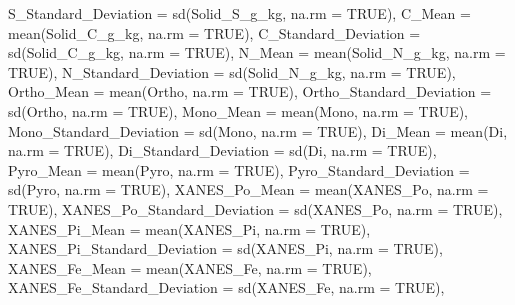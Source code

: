 \documentclass[
]{article}
\newenvironment{Shaded}{\begin{snugshade}}{\end{snugshade}}
\newcommand{\AttributeTok}[1]{\textcolor[rgb]{0.77,0.63,0.00}{#1}}
\newcommand{\ConstantTok}[1]{\textcolor[rgb]{0.00,0.00,0.00}{#1}}
\newcommand{\FunctionTok}[1]{\textcolor[rgb]{0.00,0.00,0.00}{#1}}
\newcommand{\NormalTok}[1]{#1}
\begin{document}
\begin{Shaded}
\begin{Highlighting}[]
    \AttributeTok{S\_Standard\_Deviation =} \FunctionTok{sd}\NormalTok{(Solid\_S\_g\_kg, }\AttributeTok{na.rm =} \ConstantTok{TRUE}\NormalTok{),}
    \AttributeTok{C\_Mean =} \FunctionTok{mean}\NormalTok{(Solid\_C\_g\_kg, }\AttributeTok{na.rm =} \ConstantTok{TRUE}\NormalTok{),}
    \AttributeTok{C\_Standard\_Deviation =} \FunctionTok{sd}\NormalTok{(Solid\_C\_g\_kg, }\AttributeTok{na.rm =} \ConstantTok{TRUE}\NormalTok{),}
    \AttributeTok{N\_Mean =} \FunctionTok{mean}\NormalTok{(Solid\_N\_g\_kg, }\AttributeTok{na.rm =} \ConstantTok{TRUE}\NormalTok{),}
    \AttributeTok{N\_Standard\_Deviation =} \FunctionTok{sd}\NormalTok{(Solid\_N\_g\_kg, }\AttributeTok{na.rm =} \ConstantTok{TRUE}\NormalTok{),}
    \AttributeTok{Ortho\_Mean =} \FunctionTok{mean}\NormalTok{(Ortho, }\AttributeTok{na.rm =} \ConstantTok{TRUE}\NormalTok{),}
    \AttributeTok{Ortho\_Standard\_Deviation =} \FunctionTok{sd}\NormalTok{(Ortho, }\AttributeTok{na.rm =} \ConstantTok{TRUE}\NormalTok{),}
    \AttributeTok{Mono\_Mean =} \FunctionTok{mean}\NormalTok{(Mono, }\AttributeTok{na.rm =} \ConstantTok{TRUE}\NormalTok{),}
    \AttributeTok{Mono\_Standard\_Deviation =} \FunctionTok{sd}\NormalTok{(Mono, }\AttributeTok{na.rm =} \ConstantTok{TRUE}\NormalTok{),}
    \AttributeTok{Di\_Mean =} \FunctionTok{mean}\NormalTok{(Di, }\AttributeTok{na.rm =} \ConstantTok{TRUE}\NormalTok{),}
    \AttributeTok{Di\_Standard\_Deviation =} \FunctionTok{sd}\NormalTok{(Di, }\AttributeTok{na.rm =} \ConstantTok{TRUE}\NormalTok{),}
    \AttributeTok{Pyro\_Mean =} \FunctionTok{mean}\NormalTok{(Pyro, }\AttributeTok{na.rm =} \ConstantTok{TRUE}\NormalTok{),}
    \AttributeTok{Pyro\_Standard\_Deviation =} \FunctionTok{sd}\NormalTok{(Pyro, }\AttributeTok{na.rm =} \ConstantTok{TRUE}\NormalTok{),}
    \AttributeTok{XANES\_Po\_Mean =} \FunctionTok{mean}\NormalTok{(XANES\_Po, }\AttributeTok{na.rm =} \ConstantTok{TRUE}\NormalTok{),}
    \AttributeTok{XANES\_Po\_Standard\_Deviation =} \FunctionTok{sd}\NormalTok{(XANES\_Po, }\AttributeTok{na.rm =} \ConstantTok{TRUE}\NormalTok{),}
    \AttributeTok{XANES\_Pi\_Mean =} \FunctionTok{mean}\NormalTok{(XANES\_Pi, }\AttributeTok{na.rm =} \ConstantTok{TRUE}\NormalTok{),}
    \AttributeTok{XANES\_Pi\_Standard\_Deviation =} \FunctionTok{sd}\NormalTok{(XANES\_Pi, }\AttributeTok{na.rm =} \ConstantTok{TRUE}\NormalTok{),}
    \AttributeTok{XANES\_Fe\_Mean =} \FunctionTok{mean}\NormalTok{(XANES\_Fe, }\AttributeTok{na.rm =} \ConstantTok{TRUE}\NormalTok{),}
    \AttributeTok{XANES\_Fe\_Standard\_Deviation =} \FunctionTok{sd}\NormalTok{(XANES\_Fe, }\AttributeTok{na.rm =} \ConstantTok{TRUE}\NormalTok{),}

\end{Highlighting}
\end{Shaded}
\end{document}

